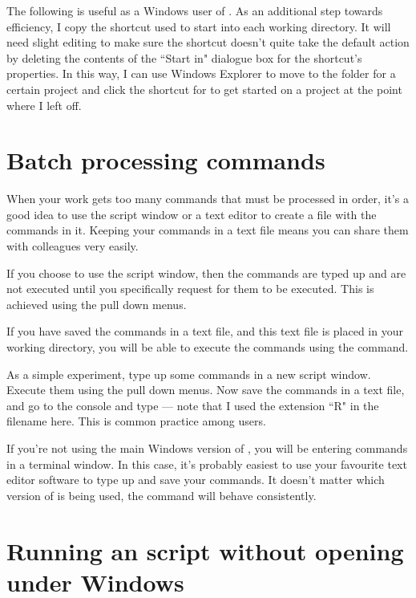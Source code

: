 The following is useful as a Windows user of \R{}. As an additional step towards efficiency, I copy the shortcut used to start \R{} into each working directory. It will need slight editing to make sure the shortcut doesn't quite take the default action by deleting the contents of the ``Start in" dialogue box for the shortcut's properties. In this way, I can use Windows Explorer to move to the folder for a certain project and click the shortcut for \R{} to get started on a project at the point where I left off. 
 
\section{Batch processing commands} 
 
When your \R{} work gets too many commands that must be processed in order, it's a good idea to use the \R{} script window or a text editor to create a file with the commands in it. Keeping your commands in a text file means you can share them with colleagues very easily. 
 
If you choose to use the \R{} script window, then the commands are typed up and are not executed until you specifically request for them to be executed. This is achieved using the pull down menus.  

 
If you have saved the commands in a text file, and this text file is placed in your working directory, you will be able to execute the commands using the  command. 
 
As a simple experiment, type up some commands in a new script window. Execute them using the pull down menus. Now save the commands in a text file, and go to the \R{} console and type  --- note that I used the extension ``R" in the filename here. This is common practice among \R{} users. 
 
If you're not using the main Windows version of \R{}, you will be entering commands in a terminal window. In this case, it's probably easiest to use your favourite text editor software to type up and save your \R{} commands. It doesn't matter which version of \R{} is being used, the  command will behave consistently. 
 
 
\section{Running an \R{} script without opening \R{} under Windows} 
 
